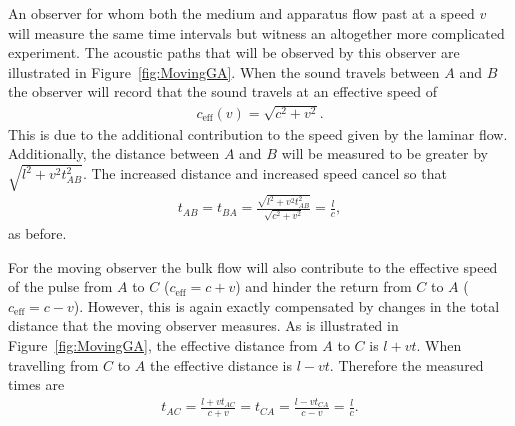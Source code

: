 \documentclass[10pt, fleqn,final,showtrims,oldfontcommands, article,a4paper,oneside]{memoir} %
\newcommand{\figref}[1]{Figure~\ref{fig:#1}}
\newcommand{\eff}{{\textrm{eff}}}
\begin{document}
An observer for whom  both the medium and apparatus flow past at a speed $v$ will measure the same time intervals 
but witness an altogether more complicated experiment.
The acoustic paths that will be observed by this observer are illustrated in \figref{MovingGA}.
When the sound travels between $A$ and $B$ the observer will record that the sound travels at an effective speed of
\begin{align}
\label{eqn:ceffone}
c_\eff(v) = \sqrt{c^2 +v^2}.
\end{align}
This is due to the additional contribution to the speed given by the  laminar flow.
Additionally, the distance between $A$ and $B$ will be measured to be greater by  $\sqrt{l^2+v^2t_{AB}^2}$.
The increased distance and increased speed cancel so that 
\begin{align}
  \label{eqn:setupA:moving:Tab}
  t_{AB} = t_{BA} = \frac{\sqrt{l^2+v^2t_{AB}^2}}{\sqrt{c^2 +v^2}} = \frac{l}{c},
\end{align}
as before.

For the moving observer the bulk flow will also contribute to the effective speed of the pulse from $A$ to $C$  ($c_\eff = c+v$) 
and hinder  the return from $C$ to $A$ ($c_\eff = c-v$).
However, this is again exactly compensated by changes in the total distance that the moving observer measures.
As is illustrated in \figref{MovingGA}, the effective distance from $A$ to $C$ is $l+vt$. %
When travelling from $C$ to $A$ the effective distance is $l-vt$. %
%
Therefore the measured times are
\begin{align}
  \label{eqn:setupA:moving:Tac}
  t_{AC} =  \frac{l+vt_{AC}}{c+v}= t_{CA} =  \frac{l-vt_{CA}}{c-v}= \frac{l}{c}.
\end{align}
\end{document}
